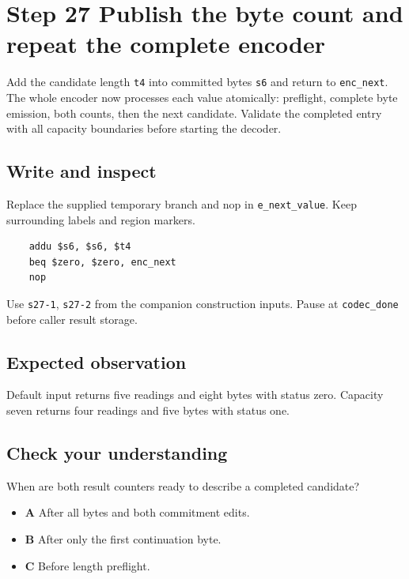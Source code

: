 \section{Step 27 Publish the byte count and repeat the complete encoder}\label{delta-s27}

Add the candidate length \texttt{t4} into committed bytes \texttt{s6} and return to \texttt{enc\_next}. The whole encoder now processes each value atomically: preflight, complete byte emission, both counts, then the next candidate. Validate the completed entry with all capacity boundaries before starting the decoder.

\subsection{Write and inspect}
Replace the supplied temporary branch and nop in \texttt{e\_next\_value}. Keep surrounding labels and region markers.

\begin{verbatim}
    addu $s6, $s6, $t4
    beq $zero, $zero, enc_next
    nop
\end{verbatim}
Use \texttt{s27-1}, \texttt{s27-2} from the companion construction inputs. Pause at \texttt{codec\_done} before caller result storage.

\subsection{Expected observation}
Default input returns five readings and eight bytes with status zero. Capacity seven returns four readings and five bytes with status one.

\subsection{Check your understanding}
When are both result counters ready to describe a completed candidate?

\begin{itemize}
\item \textbf{A} After all bytes and both commitment edits.
\item \textbf{B} After only the first continuation byte.
\item \textbf{C} Before length preflight.
\end{itemize}
